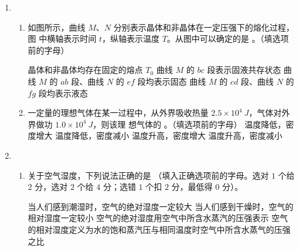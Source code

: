 \begin{enumerate}
\begin{enumerate}
 \end{enumerate}


\item 
{}
\begin{enumerate}
	\item
如图所示，曲线 $ M $、$ N $ 分别表示晶体和非晶体在一定压强下的熔化过程，图
中横轴表示时间 $ t $，纵轴表示温度 $ T $。从图中可以确定的是 \underlinegap 。（填选项
前的字母）
\begin{figure}[h!]
	\centering
	
\end{figure}

\fourchoices
{晶体和非晶体均存在固定的熔点 $ T_{0} $}
{曲线 $ M $ 的 $ bc $ 段表示固液共存状态}
{曲线 $ M $ 的 $ ab $ 段、曲线 $ N $ 的 $ ef $ 段均表示固态}
{曲线 $ M $ 的 $ cd $ 段、曲线 $ N $ 的 $ fg $ 段均表示液态}



\item 
一定量的理想气体在某一过程中，从外界吸收热量 $ 2.5 \times 10^{4} \ J $，气体对外界做功 $ 1.0 \times 10^{4} \ J $，则该理
想气体的 \underlinegap 。（填选项前的字母）
\fourchoices
{温度降低，密度增大}
{温度降低，密度减小}
{温度升高，密度增大}
{温度升高，密度减小}


\end{enumerate}


\item 
{}
\begin{enumerate}
	\item
关于空气湿度，下列说法正确的是 \underlinegap 
（填入正确选项前的字母。选对 $ 1 $ 个给 $ 2 $
分，选对 $ 2 $ 个给 $ 4 $ 分；选错 $ 1 $ 个扣 $ 2 $ 分，最低得 $ 0 $ 分）。

\fourchoices
{当人们感到潮湿时，空气的绝对湿度一定较大}
{当人们感到干燥时，空气的相对湿度一定较小}
{空气的绝对湿度用空气中所含水蒸汽的压强表示}
{空气的相对湿度定义为水的饱和蒸汽压与相同温度时空气中所含水蒸气的压强之比}


\end{enumerate}
\end{enumerate}
